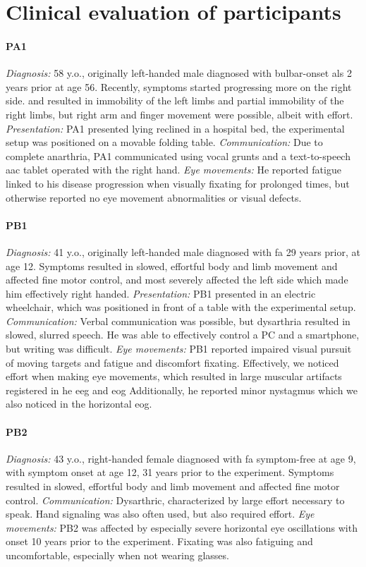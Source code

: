 \section{Clinical evaluation of participants}
\label{app:clinical-eval}

\paragraph{PA1}
\emph{Diagnosis:} 58 y.o., originally left-handed male diagnosed with bulbar-onset
\ac{als} 2 years prior at age 56.
Recently, symptoms started progressing more on the right side.
and resulted in immobility of the left limbs and partial immobility of the right
limbs, but right arm and finger movement were possible, albeit with effort.
\emph{Presentation:} PA1 presented lying reclined in a hospital bed, the
experimental setup was positioned on a movable folding table.
\emph{Communication:} Due to complete anarthria, PA1 communicated using vocal
grunts and a text-to-speech
\ac{aac} tablet operated with the right hand.
\emph{Eye movements:} He reported fatigue linked to his disease progression when
visually fixating for prolonged times, but otherwise reported no eye movement
abnormalities or visual defects.

\paragraph{PB1}
\emph{Diagnosis:} 41 y.o., originally left-handed male diagnosed with \ac{fa}
29 years prior, at age 12.
Symptoms resulted in slowed, effortful body and limb movement and affected
fine motor control, and most severely affected the left side which made him
effectively right handed.
\emph{Presentation:} PB1 presented in an electric wheelchair, which was
positioned in front of a table with the experimental setup.
\emph{Communication:} Verbal communication was possible, but dysarthria resulted
in slowed, slurred speech.
He was able to effectively control a PC and a smartphone, but writing was difficult.
\emph{Eye movements:} PB1 reported impaired visual pursuit of moving targets and
fatigue and discomfort fixating.
Effectively, we noticed effort when making eye movements, which resulted in
large muscular artifacts registered in he \ac{eeg} and \ac{eog}
Additionally, he reported minor nystagmus which we also noticed in the horizontal
\ac{eog}.

\paragraph{PB2}
\emph{Diagnosis:} 43 y.o., right-handed female diagnosed with \ac{fa}
symptom-free at age 9, with symptom onset at age 12, 31 years prior to the
experiment.
Symptoms resulted in slowed, effortful body and limb movement and affected
fine motor control.
\emph{Communication:} Dysarthric, characterized by large effort necessary to speak.
Hand signaling was also often used, but also required effort.
\emph{Eye movements:} PB2 was affected by especially severe horizontal eye
oscillations with onset 10 years prior to the experiment.
Fixating was also fatiguing and uncomfortable, especially when not wearing
glasses.

